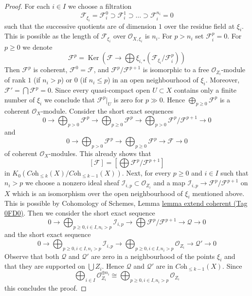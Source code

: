 \documentclass{amsart}
\theoremstyle{plain}
\theoremstyle{definition}
\theoremstyle{remark}
\numberwithin{equation}{subsection}
\def\Ker{\mathop{\mathrm{Ker}}}
\begin{document}
\begin{proof}
\medskip\noindent
For each $i \in I$ we choose a filtration
$$
\mathcal{F}_{\xi_i} = \mathcal{F}_i^0 \supset \mathcal{F}_i^1 \supset
\ldots \supset \mathcal{F}_i^{n_i} = 0
$$
such that the successive quotients are of dimension $1$ over the residue
field at $\xi_i$. This is possible as the length of $\mathcal{F}_{\xi_i}$
over $\mathcal{O}_{X, \xi_i}$ is $n_i$.
For $p > n_i$ set $\mathcal{F}_i^p = 0$. For $p \geq 0$ we denote
$$
\mathcal{F}^p =
\Ker\left(\mathcal{F} \longrightarrow \bigoplus
\xi_{i, *}(\mathcal{F}_{\xi_i}/\mathcal{F}_i^p)\right)
$$
Then $\mathcal{F}^p$ is coherent, $\mathcal{F}^0 = \mathcal{F}$, and
$\mathcal{F}^p/\mathcal{F}^{p + 1}$ is isomorphic to a free
$\mathcal{O}_{Z_i}$-module of rank $1$ (if $n_i > p$) or $0$
(if $n_i \leq p$) in an open neighbourhood of $\xi_i$. Moreover,
$\mathcal{F}' = \bigcap \mathcal{F}^p = 0$. Since every quasi-compact
open $U \subset X$ contains only a finite number of $\xi_i$
we conclude that $\mathcal{F}^p|_U$ is zero for $p \gg 0$.
Hence $\bigoplus_{p \geq 0} \mathcal{F}^p$ is a coherent
$\mathcal{O}_X$-module. Consider the short exact sequences
$$
0 \to
\bigoplus\nolimits_{p > 0} \mathcal{F}^p \to
\bigoplus\nolimits_{p \geq 0} \mathcal{F}^p \to
\bigoplus\nolimits_{p > 0} \mathcal{F}^p/\mathcal{F}^{p + 1} \to 0
$$
and
$$
0 \to
\bigoplus\nolimits_{p > 0} \mathcal{F}^p \to
\bigoplus\nolimits_{p \geq 0} \mathcal{F}^p \to
\mathcal{F} \to 0
$$
of coherent $\mathcal{O}_X$-modules. This already shows that
$$
[\mathcal{F}] = [\bigoplus \mathcal{F}^p/\mathcal{F}^{p + 1}]
$$
in $K_0(\textit{Coh}_{\leq k}(X)/\textit{Coh}_{\leq k - 1}(X))$.
Next, for every $p \geq 0$ and $i \in I$ such that $n_i > p$
we choose a nonzero ideal sheaf $\mathcal{I}_{i, p} \subset \mathcal{O}_{Z_i}$
and a map $\mathcal{I}_{i, p} \to \mathcal{F}^p/\mathcal{F}^{p + 1}$ on $X$
which is an isomorphism over the open neighbourhood of $\xi_i$
mentioned above. This is possible by
Cohomology of Schemes, Lemma \href{https://stacks.math.columbia.edu/tag/0FD0}{lemma extend coherent (Tag 0FD0)}.
Then we consider the short exact sequence
$$
0 \to
\bigoplus\nolimits_{p \geq 0, i \in I, n_i > p} \mathcal{I}_{i, p}
\to
\bigoplus \mathcal{F}^p/\mathcal{F}^{p + 1} \to
\mathcal{Q} \to 0
$$
and the short exact sequence
$$
0 \to
\bigoplus\nolimits_{p \geq 0, i \in I, n_i > p} \mathcal{I}_{i, p}
\to
\bigoplus\nolimits_{p \geq 0, i \in I, n_i > p} \mathcal{O}_{Z_i}
\to
\mathcal{Q}' \to 0
$$
Observe that both $\mathcal{Q}$ and $\mathcal{Q}'$ are zero in a neighbourhood
of the points $\xi_i$ and that they are supported on $\bigcup Z_i$.
Hence $\mathcal{Q}$ and $\mathcal{Q}'$ are in
$\textit{Coh}_{\leq k - 1}(X)$.
Since
$$
\bigoplus\nolimits_{i \in I} \mathcal{O}_{Z_i}^{\oplus n_i} \cong
\bigoplus\nolimits_{p \geq 0, i \in I, n_i > p} \mathcal{O}_{Z_i}
$$
this concludes the proof.
\end{proof}
\end{document}
